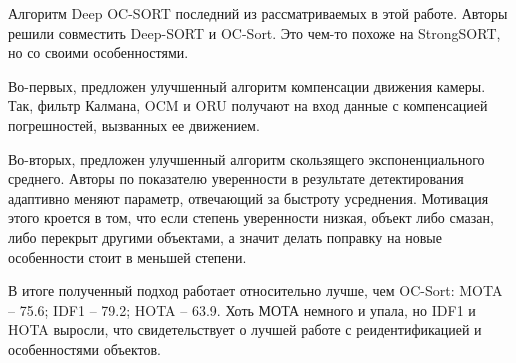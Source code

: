Алгоритм Deep OC-SORT \cite{maggiolino2023deep} последний из рассматриваемых в этой работе. 
Авторы решили совместить Deep-SORT и OC-Sort. Это чем-то похоже на StrongSORT, но со своими особенностями. 

Во-первых, предложен улучшенный алгоритм компенсации движения камеры. Так, фильтр Калмана, OCM и ORU получают на вход данные с компенсацией погрешностей, вызванных ее движением. 

Во-вторых, предложен улучшенный алгоритм скользящего экспоненциального среднего. Авторы по показателю уверенности в результате детектирования адаптивно меняют параметр, отвечающий за быстроту усреднения. Мотивация этого кроется в том, что если степень уверенности низкая, объект либо смазан, либо перекрыт другими объектами, а значит делать поправку на новые особенности стоит в меньшей степени.

В итоге полученный подход работает относительно лучше, чем OC-Sort: MOTA -- 75.6; IDF1 -- 79.2; HOTA -- 63.9. Хоть МОТА немного и упала, но IDF1 и HOTA выросли, что свидетельствует о лучшей работе с реидентификацией и особенностями объектов.
